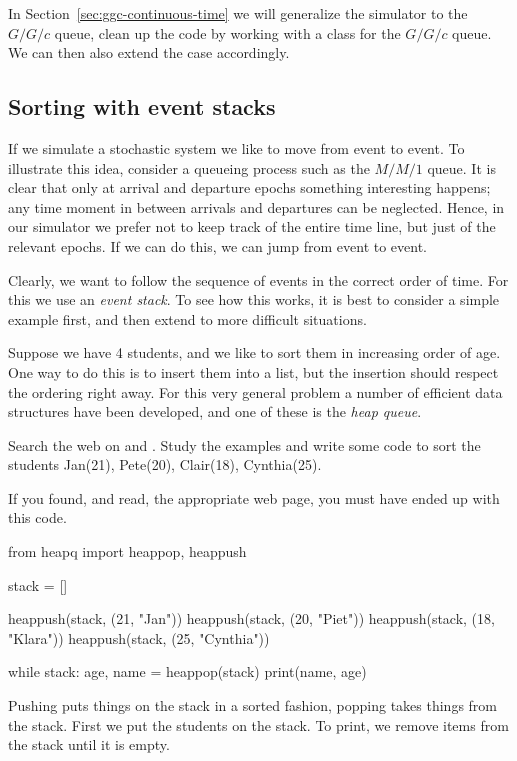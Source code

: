 In Section~\ref{sec:ggc-continuous-time} we will generalize the simulator to the $G/G/c$ queue, clean up the code by working with a class for the $G/G/c$ queue. We can then also extend the case accordingly. 


\subsection{Sorting with event stacks}
\label{sec:event-stacks}

If we simulate a stochastic system we like to move from event to event.
To illustrate this idea, consider a queueing process such as the $M/M/1$ queue.
It is clear that only at arrival and departure epochs something interesting happens; any time moment in between arrivals and departures can be neglected.
Hence, in our simulator we prefer not to keep track of the entire time line, but just of the relevant epochs.
If we can do this, we can jump from event to event.

Clearly, we want to follow the sequence of events in the correct order of time.
For this we use an \emph{event stack}.
To see how this works, it is best to consider a simple example first, and then extend to more difficult situations.

Suppose we have 4 students, and we like to sort them in increasing order of age.
One way to do this is to insert them into a list, but the insertion should respect the ordering right away.
For this very general problem a number of efficient data structures have been developed, and one of these is the \emph{heap queue}.

\begin{exercise}
  Search the web on  and . Study the examples and write some code to sort the students Jan(21), Pete(20), Clair(18), Cynthia(25).

  \begin{solution}
If you found, and read, the appropriate web page, you must have ended up with this code.
\begin{pyverbatim}
from heapq import heappop, heappush

stack = []

heappush(stack, (21, "Jan"))
heappush(stack, (20, "Piet"))
heappush(stack, (18, "Klara"))
heappush(stack, (25, "Cynthia"))

while stack:
    age, name = heappop(stack)
    print(name, age)

  \end{pyverbatim}

Pushing puts things on the stack in a sorted fashion, popping takes things from the stack. First we put the students on the stack. To print, we remove items from the stack until it is empty.
\end{solution}
  
\end{exercise}



